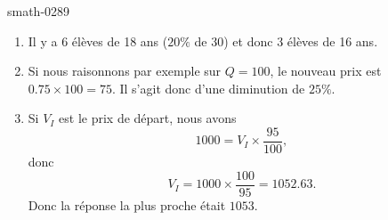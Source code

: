 
\begin{corrige}{smath-0289}

    \begin{enumerate}
        \item
    Il y a \( 6\) élèves de 18 ans (\( 20\%\) de 30) et donc \( 3\) élèves de 16 ans.
\item
    Si nous raisonnons par exemple sur \( Q=100\), le nouveau prix est \( 0.75\times 100=75\). Il s'agit donc d'une diminution de \( 25\%\).
\item
    Si \( V_I\) est le prix de départ, nous avons 
    \begin{equation}
        1000=V_I\times \frac{ 95 }{ 100 },
    \end{equation}
    donc 
    \begin{equation}
        V_I=1000\times\frac{ 100 }{ 95 }=1052.63.
    \end{equation}
    Donc la réponse la plus proche était \( 1053\).

    \end{enumerate}

\end{corrige}
